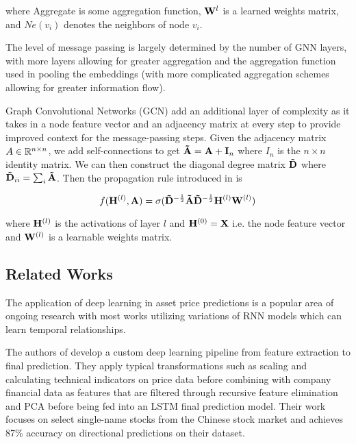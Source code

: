 where Aggregate is some aggregation function, $\mVector{W}^{l}$ is a learned weights matrix, and $Ne(v_i)$ denotes the neighbors of node $v_i$.

The level of message passing is largely determined by the number of GNN layers, with more layers allowing for greater aggregation and the aggregation function used in pooling the embeddings (with more complicated aggregation schemes allowing for greater information flow).

Graph Convolutional Networks (GCN) add an additional layer of complexity as it takes in a node feature vector and an adjacency matrix at every step to provide improved context for the message-passing steps. Given the adjacency matrix $A \in \mathbb{R}^{n \times n}$, we add self-connections to get $\mVector{\tilde{A}} = \mVector{A} + \mVector{I}_n$ where $I_n$ is the $n \times n$ identity matrix. We can then construct the diagonal degree matrix $\mVector{\tilde{D}}$ where $\mVector{\tilde{D}}_{ii} = \sum_i\mVector{\tilde{A}}$. Then the propagation rule introduced in \cite{Kipf2017} is

\begin{equation}
f(\mVector{H}^{(l)}, \mVector{A}) = \sigma(\mVector{\tilde{D}}^{-\frac{1}{2}}\mVector{\tilde{A}}\mVector{\tilde{D}}^{-\frac{1}{2}}\mVector{H}^{(l)}\mVector{W}^{(l)})
\end{equation}

where $\mVector{H}^{(l)}$ is the activations of layer $l$ and $\mVector{H}^{(0)} = \mVector{X}$ i.e. the node feature vector and $\mVector{W}^{(l)}$ is a learnable weights matrix.

\subsection{Related Works} \label{Related Works}

The application of deep learning in asset price predictions is a popular area of ongoing research with most works utilizing variations of RNN models which can learn temporal relationships.

The authors of \cite{Shen2020} develop a custom deep learning pipeline from feature extraction to final prediction. They apply typical transformations such as scaling and calculating technical indicators on price data before combining with company financial data as features that are filtered through recursive feature elimination and PCA before being fed into an LSTM final prediction model. Their work focuses on select single-name stocks from the Chinese stock market and achieves 87\% accuracy on directional predictions on their dataset.

